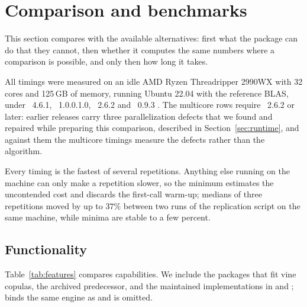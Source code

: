 \documentclass[article]{jss}
\newcommand{\pkgversion}{1.0.0.1.0}
\begin{document}
\section{Comparison and benchmarks}\label{sec:bench}

This section compares  with the available alternatives:
first what the package can do that they cannot, then whether it computes the
same numbers where a comparison is possible, and only then how long it takes.

All timings were measured on an idle AMD Ryzen Threadripper 2990WX with 32
cores and 125\,GB of memory, running Ubuntu 22.04 with the reference BLAS,
under ~4.6.1, ~\pkgversion,
~2.6.2 \citep{VineCopula} and ~0.9.3
\citep{nagler2018jss}.  The multicore rows require ~2.6.2 or
later: earlier releases carry three parallelization defects that we found and
repaired while preparing this comparison, described in
Section~\ref{sec:runtime}, and against them the multicore timings measure the
defects rather than the algorithm.

Every timing is the fastest of several repetitions.  Anything else running on
the machine can only make a repetition slower, so the minimum estimates the
uncontended cost and discards the first-call warm-up; medians of three
repetitions moved by up to $37\%$ between two runs of the replication script
on the same machine, while minima are stable to a few percent.

\subsection{Functionality}\label{sec:functionality}

Table~\ref{tab:features} compares capabilities.  We include the
 packages that fit vine copulas, the archived predecessor, and
the maintained implementations in  and ;
 binds the same engine as  and is
omitted.
\end{document}

